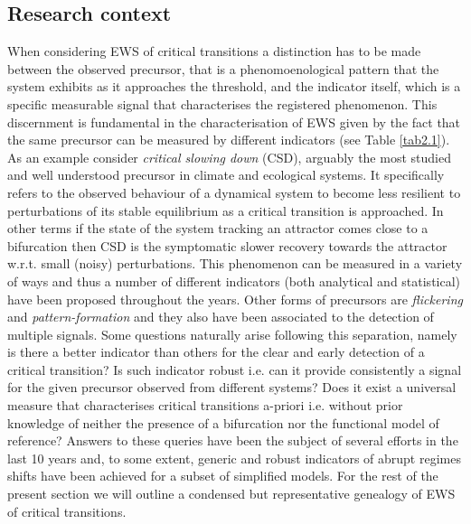 \documentclass[../main.tex]{subfiles}
\begin{document}
\subsection{Research context}\label{subsec1.2}
When considering EWS of critical transitions a distinction has to be made between the observed precursor, that is a phenomoenological pattern that the system exhibits as it approaches the threshold, and the indicator itself, which is a specific measurable signal that characterises the registered phenomenon.
This discernment is fundamental in the characterisation of EWS given by the fact that the same precursor can be measured by different indicators (see Table \ref{tab2.1}).
As an example consider \textit{critical slowing down} (CSD), arguably the most studied and well understood precursor in climate and ecological systems. 
It specifically refers to the observed behaviour of a dynamical system to become less resilient to perturbations of its stable equilibrium as a critical transition is approached. 
In other terms if the state of the system tracking an attractor comes close to a bifurcation then CSD is the symptomatic slower recovery towards the attractor w.r.t. small (noisy) perturbations.
This phenomenon can be measured in a variety of ways and thus a number of different indicators (both analytical and statistical) have been proposed throughout the years.
Other forms of precursors are \textit{flickering} and \textit{pattern-formation} and they also have been associated to the detection of multiple signals.
Some questions naturally arise following this separation, namely is there a better indicator than others for the clear and early detection of a critical transition? 
Is such indicator robust i.e. can it provide consistently a signal for the given precursor observed from different systems? 
Does it exist a universal measure that characterises critical transitions a-priori i.e. without prior knowledge of neither the presence of a bifurcation nor the functional model of reference?
Answers to these queries have been the subject of several efforts in the last 10 years and, to some extent, generic and robust indicators of abrupt regimes shifts have been achieved for a subset of simplified models.
For the rest of the present section we will outline a condensed but representative genealogy of EWS of critical transitions.




\end{document}

